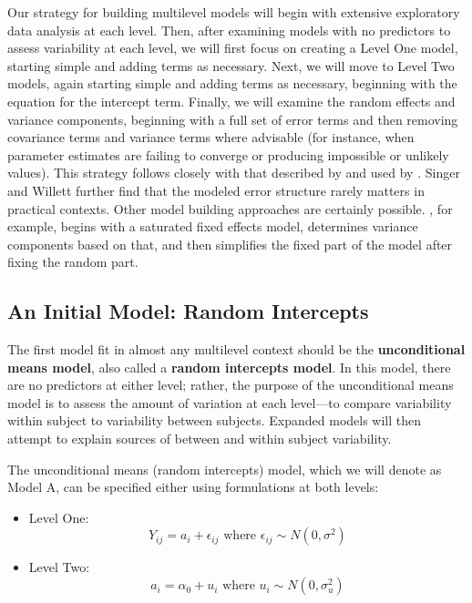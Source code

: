 \documentclass[
]{krantz}
\providecommand{\tightlist}{%
  \setlength{\itemsep}{0pt}\setlength{\parskip}{0pt}}
\begin{document}
Our strategy for building multilevel models will begin with extensive exploratory data analysis at each level. Then, after examining models with no predictors to assess variability at each level, we will first focus on creating a Level One model, starting simple and adding terms as necessary. Next, we will move to Level Two models, again starting simple and adding terms as necessary, beginning with the equation for the intercept term. Finally, we will examine the random effects and variance components, beginning with a full set of error terms and then removing covariance terms and variance terms where advisable (for instance, when parameter estimates are failing to converge or producing impossible or unlikely values). This strategy follows closely with that described by \citet{Bryk2002} and used by \citet{Singer2003}. Singer and Willett further find that the modeled error structure rarely matters in practical contexts. Other model building approaches are certainly possible. \citet{Diggle2002}, for example, begins with a saturated fixed effects model, determines variance components based on that, and then simplifies the fixed part of the model after fixing the random part.

\subsection{An Initial Model: Random Intercepts}\label{modela8}

The first model fit in almost any multilevel context should be the \textbf{unconditional means model},  also called a \textbf{random intercepts model}.  In this model, there are no predictors at either level; rather, the purpose of the unconditional means model is to assess the amount of variation at each level---to compare variability within subject to variability between subjects. Expanded models will then attempt to explain sources of between and within subject variability.

The unconditional means (random intercepts) model, which we will denote as Model A, can be specified either using formulations at both levels:

\begin{itemize}
\tightlist
\item
  Level One:
  \begin{equation*}
  Y_{ij} = a_{i}+\epsilon_{ij} \textrm{ where } \epsilon_{ij}\sim N(0,\sigma^2)
  \end{equation*}
\item
  Level Two:
  \begin{equation*}
  a_{i} = \alpha_{0}+u_{i} \textrm{ where } u_{i}\sim N(0,\sigma_{u}^{2})
  \end{equation*}
\end{itemize}
\end{document}

